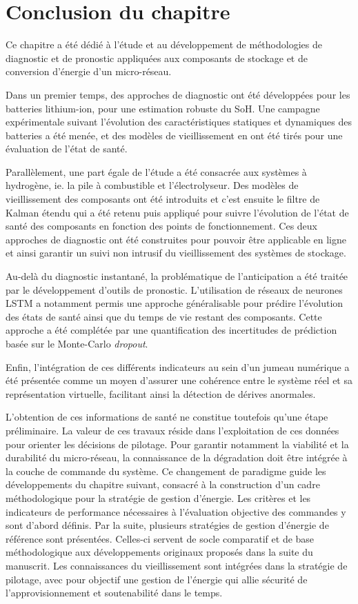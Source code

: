 \section*{Conclusion du chapitre}

Ce chapitre a été dédié à l'étude et au développement de méthodologies de diagnostic et de pronostic appliquées aux composants de stockage et de conversion d'énergie d'un micro-réseau.

Dans un premier temps, des approches de diagnostic ont été développées pour les batteries lithium-ion, pour une estimation robuste du SoH. Une campagne expérimentale suivant l'évolution des caractéristiques statiques et dynamiques des batteries a été menée, et des modèles de vieillissement en ont été tirés pour une évaluation de l'état de santé.

Parallèlement, une part égale de l'étude a été consacrée aux systèmes à hydrogène, ie. la pile à combustible et l'électrolyseur. Des
modèles de vieillissement des composants ont été introduits et c'est ensuite le filtre de Kalman étendu qui a été retenu puis appliqué pour suivre l'évolution de l'état de santé des composants en fonction des points de fonctionnement. Ces deux approches de diagnostic ont été construites pour pouvoir être applicable en ligne et ainsi garantir un suivi non intrusif du vieillissement des systèmes de stockage.

Au-delà du diagnostic instantané, la problématique de l'anticipation a été traitée par le développement d'outils de pronostic. L'utilisation de réseaux de neurones LSTM a notamment permis une approche généralisable pour prédire l'évolution des états de santé ainsi que du temps de vie restant des composants. Cette approche a été complétée par une quantification des incertitudes de prédiction basée sur le Monte-Carlo \textit{dropout}.

Enfin, l'intégration de ces différents indicateurs au sein d'un jumeau numérique a été présentée comme un moyen d'assurer une cohérence entre le système réel et sa représentation virtuelle, facilitant ainsi la détection de dérives anormales.

L'obtention de ces informations de santé ne constitue toutefois qu'une étape préliminaire. La valeur de ces travaux réside dans l'exploitation de ces données pour orienter les décisions de pilotage. Pour garantir notamment la viabilité et la durabilité du micro-réseau, la connaissance de la dégradation doit être intégrée à la couche de commande du système.
Ce changement de paradigme guide les développements du chapitre suivant, consacré à la construction d'un cadre méthodologique pour la stratégie de gestion d'énergie. Les critères et les indicateurs de performance nécessaires à l'évaluation objective des commandes y sont d'abord définis. Par la suite, plusieurs stratégies de gestion d'énergie de référence sont présentées. Celles-ci servent de socle comparatif et de base méthodologique aux développements originaux proposés dans la suite du manuscrit. Les connaissances du vieillissement sont intégrées dans la stratégie de pilotage, avec pour objectif une gestion de l'énergie qui allie sécurité de l'approvisionnement et soutenabilité dans le temps.